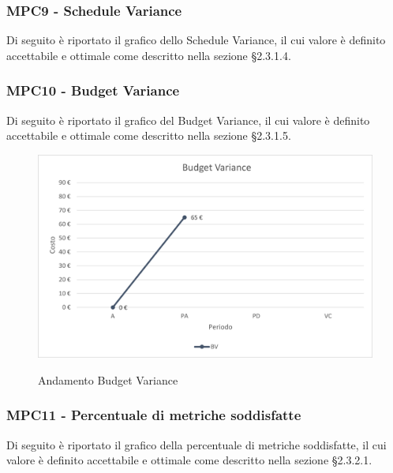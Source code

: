 \subsubsection{MPC9 - Schedule Variance}
Di seguito è riportato il grafico dello Schedule Variance, il cui valore è definito accettabile e ottimale come descritto nella sezione §2.3.1.4.\\

\subsubsection{MPC10 - Budget Variance}
Di seguito è riportato il grafico del Budget Variance, il cui valore è definito accettabile e ottimale come descritto nella sezione §2.3.1.5.\\

\begin{figure}[H]
\centering
\includegraphics[scale=0.78]{res/ResocontoAttivitaDiVerifica/res/metriche/grafici/img/budgetVariance.png}\\
\caption{Andamento Budget Variance}
\end{figure}


\subsubsection{MPC11 - Percentuale di metriche soddisfatte}
Di seguito è riportato il grafico della percentuale di metriche soddisfatte, il cui valore è definito accettabile e ottimale come descritto nella sezione §2.3.2.1.\\

